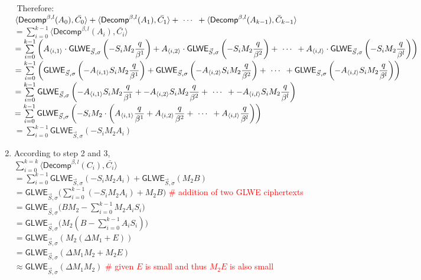 \begin{enumerate}
$ $
Therefore: \\
$\langle \textsf{Decomp}^{\beta, l}(A_0), \bar{C_0} \rangle + \langle \textsf{Decomp}^{\beta, l}(A_1), \bar{C_1} \rangle + \text{ } \text{$\cdots$} \text{ } + \langle \textsf{Decomp}^{\beta, l}(A_{k-1}), \bar{C}_{k-1} \rangle$ \\
$= \sum\limits_{i=0}^{k-1}\langle \textsf{Decomp}^{\beta, l}(A_i), \bar{C_i} \rangle$ \\
$= \sum\limits_{i=0}^{k-1}\left(A_{\langle i, 1\rangle} \cdot \textsf{GLWE}_{\vec{S}, \sigma}\left(-S_iM_2\dfrac{q}{\beta^1}\right) + A_{\langle i, 2\rangle} \cdot \textsf{GLWE}_{\vec{S}, \sigma}\left(-S_iM_2\dfrac{q}{\beta^2}\right) + \text{ } \text{$\cdots$} \text{ } + A_{\langle i, l\rangle} \cdot \textsf{GLWE}_{\vec{S}, \sigma}\left(-S_iM_2\dfrac{q}{\beta^l}\right)\right)$ \\
$= \sum\limits_{i=0}^{k-1}\left(\textsf{GLWE}_{\vec{S}, \sigma}\left(-A_{\langle i, 1\rangle}S_iM_2\dfrac{q}{\beta^1}\right) + \textsf{GLWE}_{\vec{S}, \sigma}\left(-A_{\langle i, 2\rangle}S_iM_2\dfrac{q}{\beta^2}\right) + \text{ } \text{$\cdots$} \text{ } + \textsf{GLWE}_{\vec{S}, \sigma}\left(-A_{\langle i, l\rangle}S_iM_2\dfrac{q}{\beta^l}\right)\right)$ \\
$= \sum\limits_{i=0}^{k-1}\textsf{GLWE}_{\vec{S}, \sigma}\left(-A_{\langle i, 1\rangle}S_iM_2\dfrac{q}{\beta^1} + -A_{\langle i, 2\rangle}S_iM_2\dfrac{q}{\beta^2} + \text{ } \text{$\cdots$} \text{ } + -A_{\langle i, l\rangle}S_iM_2\dfrac{q}{\beta^l}\right)$ \\
$= \sum\limits_{i=0}^{k-1}\textsf{GLWE}_{\vec{S}, \sigma}\left(-S_iM_2 \cdot \left(A_{\langle i, 1\rangle}\dfrac{q}{\beta^1} + A_{\langle i, 2\rangle}\dfrac{q}{\beta^2} + \text{ } \text{$\cdots$} \text{ } + A_{\langle i, l\rangle}\dfrac{q}{\beta^l}\right)\right)$ \\
$= \sum\limits_{i=0}^{k-1}\textsf{GLWE}_{\vec{S}, \sigma}(-S_iM_2A_i)$
\item According to step 2 and 3, \\
$\sum\limits_{i=0}^{k=k}\langle \textsf{Decomp}^{\beta, l}(C_i), \bar{C_i} \rangle$ \\
$= \sum\limits_{i=0}^{k-1}\textsf{GLWE}_{\vec{S}, \sigma}(-S_iM_2A_i) + \textsf{GLWE}_{\vec{S}, \sigma} (M_{2}B)$ \\ 
$= \textsf{GLWE}_{\vec{S}, \sigma}\Big(\sum\limits_{i=0}^{k-1}(-S_iM_2A_i) + M_{2}B\Big)$ \textcolor{red}{\# addition of two GLWE ciphertexts} \\ 
$= \textsf{GLWE}_{\vec{S}, \sigma}\Big(BM_2 - \sum\limits_{i=0}^{k-1}M_2A_iS_i\Big)$  \\ 
$= \textsf{GLWE}_{\vec{S}, \sigma}\Big(M_2(B - \sum\limits_{i=0}^{k-1}A_iS_i)\Big)$\\
$= \textsf{GLWE}_{\vec{S}, \sigma}(M_2(\Delta M_1 + E))$ \\
$= \textsf{GLWE}_{\vec{S}, \sigma}(\Delta M_1M_2 + M_2E)$ \\
$\approx \textsf{GLWE}_{\vec{S}, \sigma}(\Delta M_1M_2)$ \textcolor{red}{\# given $E$ is small and thus $M_2E$ is also small}
\end{enumerate}


